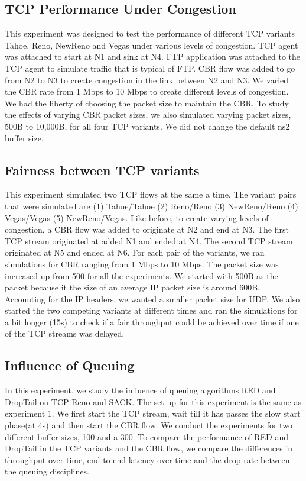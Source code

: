  \subsection{TCP Performance Under Congestion}
This experiment was designed to test the performance of different TCP variants Tahoe, Reno, NewReno and Vegas under various levels of congestion. TCP agent was attached to start at N1 and sink at N4. FTP application was attached to the TCP agent to simulate traffic that is typical of FTP. CBR flow was added to go from N2 to N3 to create congestion in the link between N2 and N3. We varied the CBR rate from 1 Mbps to 10 Mbps to create different levels of congestion. We had the liberty of choosing the packet size to maintain the CBR. To study the effects of varying CBR packet sizes, we also simulated varying packet sizes, 500B to 10,000B, for all four TCP variants. We did not change the default ns2 buffer size.
 \subsection{Fairness between TCP variants}
This experiment simulated two TCP flows at the same a time. The variant pairs that were simulated are (1) Tahoe/Tahoe (2) Reno/Reno (3) NewReno/Reno (4) Vegas/Vegas (5) NewReno/Vegas. Like before, to create varying levels of congestion, a CBR flow was added to originate at N2 and end at N3. The first TCP stream originated at added N1 and ended at N4. The second TCP stream originated at N5 and ended at N6. For each pair of the variants, we ran simulations for CBR ranging from 1 Mbps to 10 Mbps. The packet size was increased up from 500 for all the experiments. We started with 500B as the packet because it the size of an average IP packet size is around 600B. Accounting for the IP headers, we wanted a smaller packet size for UDP. 
We also started the two competing variants at different times and ran the simulations for a bit longer (15s) to check if a fair throughput could be achieved over time if one of the TCP streams was delayed.
 \subsection{Influence of Queuing}
In this experiment, we study the influence of queuing algorithms RED and DropTail on TCP Reno and SACK. The set up for this experiment is the same as experiment 1. We first start the TCP stream, wait till it has passes the slow start phase(at 4s) and then start the CBR flow. We conduct the experiments for two different buffer sizes, 100 and a 300. To compare the performance of RED and DropTail in the TCP variants and the CBR flow, we compare the differences in throughput over time, end-to-end latency over time and the drop rate between the queuing disciplines. 